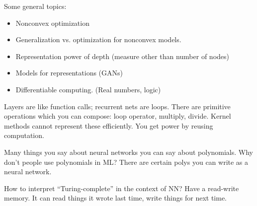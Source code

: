 Some general topics:
\begin{itemize}
\item
Nonconvex optimization
\item
Generalization vs. optimization for nonconvex models.
\item
Representation power of depth (measure other than number of nodes)
\item Models for representations (GANs)
\item Differentiable computing. (Real numbers, logic)
\end{itemize}
Layers are like function calls; recurrent nets are loops. There are primitive operations which you can compose: loop operator, multiply, divide. 
Kernel methods cannot represent these efficiently. 
You get power by reusing computation.

Many things you say about neural networks you can say about polynomials. Why don't people use polynomials in ML? 
There are certain polys you can write as a neural network.




How to interpret ``Turing-complete'' in the context of NN? Have a read-write memory.  
It can read things it wrote last time, write things for next time.






